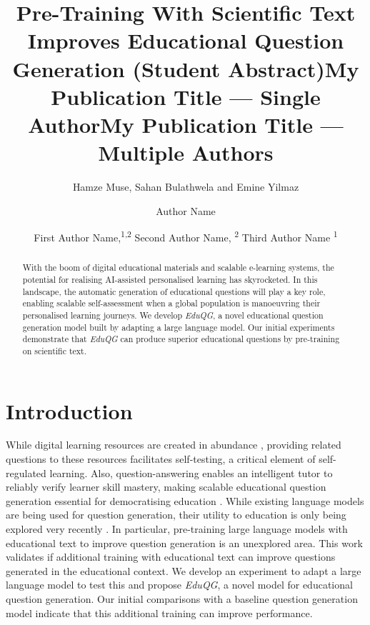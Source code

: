 \documentclass[letterpaper]{article} %
\title{Pre-Training With Scientific Text Improves Educational Question Generation (Student Abstract)}
\author{
Hamze Muse\equalcontrib,
Sahan Bulathwela\equalcontrib
and Emine Yilmaz
}
\title{My Publication Title --- Single Author}
\author {
Author Name
}
\title{My Publication Title --- Multiple Authors}
\author {
First Author Name,\textsuperscript{\rm 1,\rm 2}
Second Author Name, \textsuperscript{\rm 2}
Third Author Name \textsuperscript{\rm 1}
}
\begin{document}
\maketitle

\begin{abstract}
With the boom of digital educational materials and scalable e-learning systems, the potential for realising AI-assisted personalised learning has skyrocketed. In this landscape, the automatic generation of educational questions will play a key role, enabling scalable self-assessment when a global population is manoeuvring their personalised learning journeys. We develop \textit{EduQG}, a novel educational question generation model built by adapting a large language model. Our initial experiments demonstrate that \textit{EduQG} can produce superior educational questions by pre-training on scientific text.
\end{abstract}

\section{Introduction}
While digital learning resources are created in abundance
\cite{truelearn}, providing related questions
to these resources
facilitates self-testing, a critical element of self-regulated learning.
Also, question-answering enables an intelligent tutor to reliably verify learner skill mastery,
making scalable educational question generation essential for democratising education \cite{ai_ed_demo,zhang2021review}.
While existing language models are being used for question generation,
their utility
to education is only being explored very recently \cite{wang2022towards}. In particular, pre-training large language models with educational text to improve question generation is an unexplored area.
This work validates if additional training with educational text can improve questions generated in the educational context. We develop an experiment to adapt a large language model to test this and propose \emph{EduQG}, a novel model for educational question generation. Our initial comparisons with a baseline question generation model indicate that this additional training can improve performance.
\end{document}
